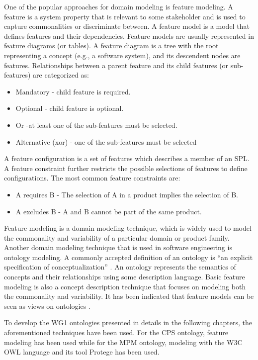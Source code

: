 \documentclass[final]{include/MPM4CPS/MPM4CPS-Report} %
\newcommand{\uidx}[1]{\index[used]{#1}}  %
\begin{document}
One of the popular approaches for domain modeling is feature modeling. A feature
is a system property that is relevant to some stakeholder\uidx{Stakeholder} and is used to capture
commonalities or discriminate between. A feature model is a model that defines
features and their dependencies. Feature models are usually represented in
feature diagrams (or tables). A feature diagram is a tree with the root
representing a concept (e.g., a software system), and its descendent nodes are
features. Relationships between a parent feature and its child features (or
sub-features) are categorized as:

\begin{itemize}
	\item Mandatory - child feature is required.
	\item Optional - child feature is optional.
	\item Or -at least one of the sub-features must be selected.
	\item Alternative (xor) - one of the sub-features must be selected
\end{itemize}

A feature configuration is a set of features which describes a member of an SPL.
A feature constraint further restricts the possible selections of features to
define configurations.  The most common feature constraints\uidx{Constraint} are:

\begin{itemize}
	\item A requires B - The selection of A in a product implies the selection of B.
	\item A excludes B - A and B cannot be part of the same product.
\end{itemize}

Feature modeling is a domain modeling technique, which is widely used to model
the commonality and variability of a particular domain or product family.
Another domain modeling technique that is used in software engineering is
ontology modeling. A commonly accepted definition of an ontology is
``an explicit specification of conceptualization'' \cite{Gruber1995}. An
ontology represents the semantics of concepts and their relationships using some description language. Basic feature modeling is also a concept description technique that focuses on modeling both the commonality and variability. It has been indicated that feature models can be seen as views on ontologies \cite{Czarnecki2006}.

To develop the WG1 ontologies presented in details in the following chapters, the aforementioned techniques have been used. For the CPS ontology, feature modeling has been used while for the MPM ontology, modeling with the W3C OWL language and its tool Protege has been used. 
\end{document}
